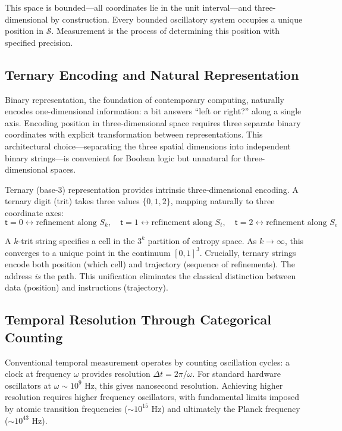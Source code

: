 \documentclass[11pt,a4paper]{article}
\theoremstyle{remark}
\newcommand{\Sk}{S_k}
\newcommand{\St}{S_t}
\newcommand{\Se}{S_e}
\newcommand{\Sspace}{\mathcal{S}}
\newcommand{\trit}{\mathsf{t}}
\begin{document}
This space is bounded—all coordinates lie in the unit interval—and three-dimensional by construction. Every bounded oscillatory system occupies a unique position in $\Sspace$. Measurement is the process of determining this position with specified precision.

\subsection{Ternary Encoding and Natural Representation}

Binary representation, the foundation of contemporary computing, naturally encodes one-dimensional information: a bit answers ``left or right?'' along a single axis. Encoding position in three-dimensional space requires three separate binary coordinates with explicit transformation between representations. This architectural choice—separating the three spatial dimensions into independent binary strings—is convenient for Boolean logic but unnatural for three-dimensional spaces.

Ternary (base-3) representation provides intrinsic three-dimensional encoding. A ternary digit (trit) takes three values $\{0, 1, 2\}$, mapping naturally to three coordinate axes:
\begin{equation}
\trit = 0 \leftrightarrow \text{refinement along } \Sk, \quad
\trit = 1 \leftrightarrow \text{refinement along } \St, \quad
\trit = 2 \leftrightarrow \text{refinement along } \Se
\end{equation}

A $k$-trit string specifies a cell in the $3^k$ partition of entropy space. As $k \to \infty$, this converges to a unique point in the continuum $[0,1]^3$. Crucially, ternary strings encode both position (which cell) and trajectory (sequence of refinements). The address \textit{is} the path. This unification eliminates the classical distinction between data (position) and instructions (trajectory).

\subsection{Temporal Resolution Through Categorical Counting}

Conventional temporal measurement operates by counting oscillation cycles: a clock at frequency $\omega$ provides resolution $\Delta t = 2\pi/\omega$. For standard hardware oscillators at $\omega \sim 10^9$ Hz, this gives nanosecond resolution. Achieving higher resolution requires higher frequency oscillators, with fundamental limits imposed by atomic transition frequencies ($\sim 10^{15}$ Hz) and ultimately the Planck frequency ($\sim 10^{43}$ Hz).
\end{document}

